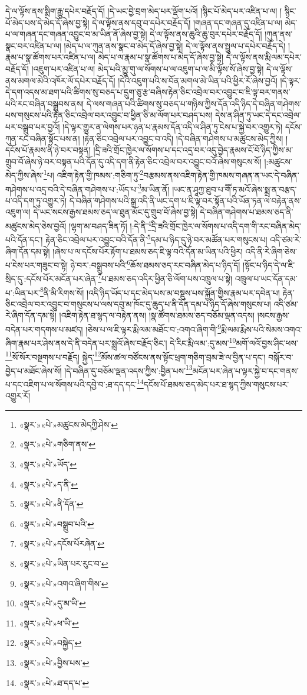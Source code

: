 དེ་ལ་ལྟོས་ནས་སྨིག་རྒྱུ་དཔེར་བརྗོད་དོ། །དེ་ཡང་བྱེ་བྲག་མེད་པར་ལྡོག་པའོ། །སྙིང་པོ་མེད་པར་འཛིན་པ་ལ། །
སྙིང་པོ་མེད་པས་དེ་མེད་དོ་ཞེས་བྱ་སྟེ། དེ་ལ་ལྟོས་ནས་དབུ་བ་དཔེར་བརྗོད་དོ། །གཞན་དང་གཞན་དུ་འཛིན་པ་ལ། མེད་པ་ལ་གཞན་དང་གཞན་འབྱུང་བ་མ་ཡིན་ནོ་ཞེས་བྱ་སྟེ། དེ་ལ་ལྟོས་ནས་ཆུའི་ཆུ་བུར་དཔེར་བརྗོད་དོ། །ཀུན་ནས་སྣང་བར་འཛིན་པ་ལ། །མེད་པ་ལ་ཀུན་ནས་སྣང་བ་མེད་དོ་ཞེས་བྱ་སྟེ། དེ་ལ་ལྟོས་ནས་སྤྲུལ་པ་དཔེར་བརྗོད་དེ། །རྣམ་པ་སྣ་ཚོགས་པར་འཛིན་པ་ལ། མེད་པ་ལ་རྣམ་པ་སྣ་ཚོགས་པ་མེད་དོ་ཞེས་བྱ་སྟེ། དེ་ལ་ལྟོས་ནས་རྨི་ལམ་དཔེར་བརྗོད་དོ། །འཇུག་པར་འཛིན་པ་ལ། མེད་པའི་མྱུ་གུ་ལ་སོགས་པ་ལ་འཇུག་པ་ལ་མི་ལྟོས་སོ་ཞེས་བྱ་སྟེ། དེ་ལ་ལྟོས་ནས་མགལ་མེའི་འཁོར་ལོ་དཔེར་བརྗོད་དོ། །དེའི་འཇུག་པའི་ས་བོན་མགལ་མེ་ཡིན་པའི་ཕྱིར་རོ་ཞེས་བྱའོ། །དེ་ལྟར་དེ་དག་འདས་མ་ཐག་པའི་ཚིགས་སུ་བཅད་པ་དྲུག་ཅུ་རྩ་བཞིས་རྟེན་ཅིང་འབྲེལ་བར་འབྱུང་བ་ཇི་ལྟ་བར་གནས་པའི་རང་བཞིན་བསྒྲུབས་ནས། དེ་ལས་གཞན་པའི་ཚིགས་སུ་བཅད་པ་གཉིས་ཀྱིས་དོན་འདི་ཉིད་དེ་བཞིན་གཤེགས་པས་གསུངས་པའི་རྟེན་ཅིང་འབྲེལ་བར་འབྱུང་བ་ཕྱིན་ཅི་མ་ལོག་པར་བཤད་པས། དེས་ན་ཤིན་ཏུ་ཡང་དེ་དང་འབྲེལ་པར་བསྒྲུབ་པར་བྱའོ། །དེ་ལྟར་གྱུར་ན་ལེགས་པར་ཉན་པ་རྣམས་དོན་འདི་ལ་ཤིན་ཏུ་ངེས་པ་སྐྱེ་བར་འགྱུར་ཏེ། དངོས་ཀུན་རང་བཞིན་སྟོང་པས་ན། །རྟེན་ཅིང་འབྲེལ་པར་འབྱུང་བ་འདི། །དེ་བཞིན་གཤེགས་པ་མཚུངས་མེད་ཀྱིས། །དངོས་པོ་རྣམས་ནི་ཉེ་བར་བསྟན། །དྲི་ཟའི་གྲོང་ཁྱེར་ལ་སོགས་པ་དང་འདྲ་བར་འདུ་བྱེད་རྣམས་ངོ་བོ་ཉིད་ཀྱིས་མ་གྲུབ་བོ་ཞེས་ཉེ་བར་བསྟན་པའི་དོན་དུ་འདི་དག་ནི་རྟེན་ཅིང་འབྲེལ་བར་འབྱུང་བའོ་ཞེས་གསུངས་སོ། །:མཚུངས་མེད་ཀྱིས་ཞེས་\footnote{«སྣར་»«པེ་»མཚུངས་མེདཀྱི་ཤེས་}པ། འཇིག་རྟེན་གྱི་ཁམས་:གཅིག་ཏུ་\footnote{«སྣར་»«པེ་»གཅིག་ནས་}བརྩམས་ནས་འཇིག་རྟེན་གྱི་ཁམས་གཞན་ན་ཡང་དེ་བཞིན་གཤེགས་པ་འདྲ་བའི་དེ་བཞིན་གཤེགས་པ་:ཡོད་པ་\footnote{«སྣར་»«པེ་»ཡོད་}མ་ཡིན་ནོ། །ཡང་ན་ཤཱཀྱ་ཐུབ་པ་གཽ་ཏ་མའོ་ཞེས་སྨྲ་ན་བརྩད་པ་འདི་དག་ཏུ་འགྱུར་ཏེ། དེ་བཞིན་གཤེགས་པའི་སྒྲ་འདི་ནི་ཡང་དག་པ་ཇི་ལྟ་བར་སྟོན་པའི་ཡོན་ཏན་ལ་བརྟེན་ནས་འཇུག་ལ། དེ་ཡང་སངས་རྒྱས་ཐམས་ཅད་ལ་ཐུན་མོང་དུ་གྲུབ་བོ་ཞེས་བྱ་སྟེ། དེ་བཞིན་གཤེགས་པ་ཐམས་ཅད་ནི་མཚུངས་མེད་ཅེས་བྱའོ། །ལྷག་མ་བཤད་ཟིན་ཏོ། །:དེ་ནི་\footnote{«སྣར་»«པེ་»ད་ནི་}དྲི་ཟའི་གྲོང་ཁྱེར་ལ་སོགས་པ་འདི་དག་གི་རང་བཞིན་མེད་པའི་དོན་དང་། རྟེན་ཅིང་འབྲེལ་པར་འབྱུང་བའི་དོན་ནི་\footnote{«སྣར་»«པེ་»ནི་དོན་}དམ་པ་ཉིད་དུ་ཉེ་བར་མཚོན་པར་གསུངས་པ། འདི་ཙམ་རེ་ཞིག་དོན་དམ་སྟེ། །ཞེས་པ་ལ་དངོས་པོར་རྟོག་པ་ཐམས་ཅད་ཇི་ལྟ་བའི་དོན་མ་ཡིན་པའི་ཕྱིར། འདི་ནི་རེ་ཞིག་ཅེས་པ་ངེས་པར་གཟུང་བ་སྟེ། ཉེ་བར་:བསྒྲུབས་པའི་\footnote{«སྣར་»«པེ་»བསྒྲུབ་པའི་}ཆོས་ཐམས་ཅད་རང་བཞིན་མེད་པ་ཉིད་དོ། །སྟོང་པ་ཉིད་དེ་ལ་ཇི་སྲིད་དུ་:དངོས་པོར་མངོན་པར་ཞེན་\footnote{«སྣར་»«པེ་»དངོས་པོརཞེན་}པ་ཐམས་ཅད་འདིར་ཕྱིན་ཅི་ལོག་པས་འཁྲུལ་པ་སྟེ། འཁྲུལ་པ་ཡང་དོན་དམ་པ་:ཡིན་པར་\footnote{«སྣར་»«པེ་»ཡིན་པར་རུང་བ་}ནི་མི་རིགས་སོ། །འདི་ཉིད་ཡོད་པ་དང་མེད་པས་མ་བསྡུས་པས་སྐྱོན་གྱིས་རྣམ་པར་དབེན་པ། རྟེན་ཅིང་འབྲེལ་བར་འབྱུང་བ་གསུངས་པ་ལས་དབུ་མ་ཁོང་དུ་ཆུད་པ་ནི་དོན་དམ་པ་ཉིད་དོ་ཞེས་གསུངས་པ། འདི་ཙམ་རེ་ཞིག་དོན་དམ་སྟེ། །འཇིག་རྟེན་ཐ་སྙད་ལ་བརྟེན་ནས། །སྣ་ཚོགས་ཐམས་ཅད་བཅོམ་ལྡན་འདས། །སངས་རྒྱས་བདེན་པར་གདགས་པ་མཛད། །ཅེས་པ་ལ་ཇི་ལྟར་རྨི་ལམ་མཐོང་བ་:འགའ་ཞིག་གི་\footnote{«སྣར་»«པེ་»འགའ་ཞིག་གིས་}རྨི་ལམ་རྨིས་པའི་སེམས་འགའ་ཞིག་རྣམ་པར་ཤེས་ནས་དེ་ནི་བདེན་པར་སྨྲའོ་ཞེས་བརྗོད་ཅིང་། དེ་རིང་རྨི་ལམ་:དུ་མས་\footnote{«སྣར་»«པེ་»དུ་མ་ཡི་}མགོ་ལའོ་བྱས་ཤིང་ཕས་\footnote{«སྣར་»«པེ་»ཕ་ཡི་}སོ་སོར་བསྔགས་པ་བརྗོད། སྐྱེད་\footnote{«སྣར་»«པེ་»བསྐྱེད་}མོས་ཚལ་བཙོངས་ནས་སྟོང་ཕྲག་གཅིག་བྲམ་ཟེ་ལ་བྱིན་པ་དང་། བསྐོར་བ་བྱེད་པ་མཐོང་ཞེས་སོ། །དེ་བཞིན་དུ་བཅོམ་ལྡན་འདས་ཀྱིས་:བྱིན་པས་\footnote{«སྣར་»«པེ་»བྱིས་པས་}མངོན་པར་ཞེན་པ་ལྟར་སྐྱེ་བ་དང་གནས་པ་དང་འཇིག་པ་ལ་སོགས་པའི་དབྱེ་བ་:ཐ་དད་དང་\footnote{«སྣར་»«པེ་»ཐ་དད་པ་}དངོས་པོ་ཐམས་ཅད་མེད་པར་ཐ་སྙད་ཀྱིས་གསུངས་པར་འགྱུར་རོ། 